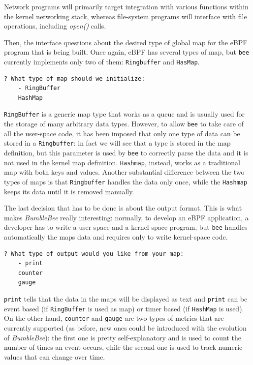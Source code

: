 Network programs will primarily target integration with various functions within the kernel networking stack, whereas file-system programs will interface with file operations, including \textit{open()} calls.

Then, the interface questions about the desired type of global map for the eBPF program that is being built.
Once again, eBPF has several types of map, but \verb|bee| currently implements only two of them: \verb|Ringbuffer| and \verb|HasMap|.

\begin{lstlisting}[language=bash, caption={bee map type selection}]
	? What type of map should we initialize: 
	- RingBuffer
	HashMap
\end{lstlisting}

\verb|RingBuffer| is a generic map type that works as a queue and is usually used for the storage of many arbitrary data types.
However, to allow \verb|bee| to take care of all the user-space code, it has been imposed that only one type of data can be stored in a \verb|Ringbuffer|: in fact we will see that a type is stored in the map definition, but this parameter is used by \verb|bee| to correctly parse the data and it is not used in the kernel map definition. 
\verb|Hashmap|, instead, works as a traditional map with both keys and values.
Another substantial difference between the two types of maps is that \verb|Ringbuffer| handles the data only once, while the \verb|Hashmap| keeps its data until it is removed manually.

The last decision that has to be done is about the output format.
This is what makes \textit{BumbleBee} really interesting: normally, to develop an eBPF application, a developer has to write a user-space and a kernel-space program, but \verb|bee| handles automatically the maps data and requires only to write kernel-space code.

\begin{lstlisting}[language=bash, caption={bee output format selection}]
	? What type of output would you like from your map: 
	- print
	counter
	gauge
\end{lstlisting}

\verb|print| tells that the data in the maps will be displayed as text and \verb|print| can be event based (if \verb|RingBuffer| is used as map) or timer based (if \verb|HashMap| is used).
On the other hand, \verb|counter| and \verb|gauge| are two types of metrics that are currently supported (as before, new ones could be introduced with the evolution of \textit{BumbleBee}): the first one is pretty self-explanatory and is used to count the number of times an event occurs, qhile the second one is used to track numeric values that can change over time.

